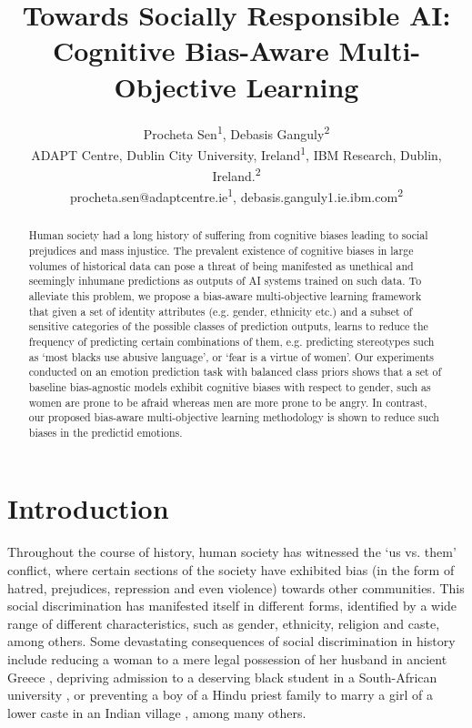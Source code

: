 \documentclass[letterpaper]{article}
\begin{document}
\title{Towards Socially Responsible AI: Cognitive Bias-Aware Multi-Objective Learning
}

\author{Procheta Sen\textsuperscript{\rm 1}, Debasis Ganguly\textsuperscript{\rm 2} \\ 
ADAPT Centre, Dublin City University, Ireland\textsuperscript{\rm 1}, IBM Research, Dublin, Ireland.\textsuperscript{\rm 2} \\
procheta.sen@adaptcentre.ie\textsuperscript{\rm 1}, debasis.ganguly1.ie.ibm.com\textsuperscript{\rm 2}
}



\maketitle

\begin{abstract}
Human society had a long history of suffering from cognitive biases leading to social prejudices and mass injustice.
The prevalent existence of cognitive biases in large volumes of historical data can pose a threat of being manifested as unethical and seemingly inhumane predictions as outputs of AI systems trained on such data.
To alleviate this problem, we propose a bias-aware multi-objective learning framework that given a set of identity attributes (e.g. gender, ethnicity etc.) and a subset of sensitive categories of the possible classes of prediction outputs, learns to reduce the frequency of predicting certain combinations of them, e.g. predicting stereotypes such as `most blacks use abusive language', or `fear is a virtue of women'. Our experiments conducted on an emotion prediction task with balanced class priors shows that a set of baseline bias-agnostic models exhibit cognitive biases with respect to gender, such as women are prone to be afraid whereas men are more prone to be angry. In contrast, our proposed bias-aware multi-objective learning methodology is shown to reduce such biases in the  predictid emotions.
\end{abstract}

\section{Introduction}

Throughout the course of history, human society has witnessed the `us vs. them' conflict,
where certain sections of the society have exhibited bias (in the form of hatred, prejudices, repression and even violence) towards other communities.
This social discrimination has manifested itself in different forms, identified by a wide range of different characteristics, such as gender, ethnicity, religion and caste, among others. Some devastating consequences of social discrimination in history include reducing a woman to a mere legal possession of her husband in ancient Greece \citep{Blundel}, depriving admission to a deserving black student in a South-African university \citep{Schaefer}, or preventing a boy of a Hindu priest family to marry a girl of a lower caste in an Indian village \citep{RameshChandra}, among many others. 
\end{document}
